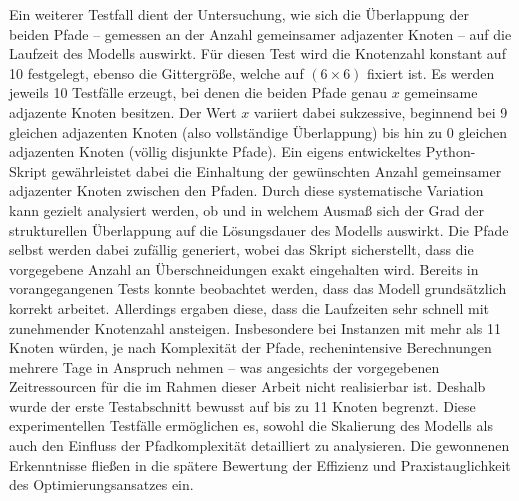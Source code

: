 \documentclass[bachelor, german]{algothesis}
\begin{document}
Ein weiterer Testfall dient der Untersuchung, wie sich die Überlappung der beiden Pfade – gemessen an der Anzahl gemeinsamer adjazenter Knoten – auf die Laufzeit des Modells auswirkt. Für diesen Test wird die Knotenzahl konstant auf 10 festgelegt, ebenso die Gittergröße, welche auf $(6 \times 6)$ fixiert ist. Es werden jeweils 10 Testfälle erzeugt, bei denen die beiden Pfade genau $x$ gemeinsame adjazente Knoten besitzen. Der Wert $x$ variiert dabei sukzessive, beginnend bei 9 gleichen adjazenten Knoten (also vollständige Überlappung) bis hin zu 0 gleichen adjazenten Knoten (völlig disjunkte Pfade). Ein eigens entwickeltes Python-Skript gewährleistet dabei die Einhaltung der gewünschten Anzahl gemeinsamer adjazenter Knoten zwischen den Pfaden. Durch diese systematische Variation kann gezielt analysiert werden, ob und in welchem Ausmaß sich der Grad der strukturellen Überlappung auf die Lösungsdauer des Modells auswirkt. Die Pfade selbst werden dabei zufällig generiert, wobei das Skript sicherstellt, dass die vorgegebene Anzahl an Überschneidungen exakt eingehalten wird.
\newline
Bereits in vorangegangenen Tests konnte beobachtet werden, dass das Modell grundsätzlich korrekt arbeitet. Allerdings ergaben diese, dass die Laufzeiten sehr schnell mit zunehmender Knotenzahl ansteigen. Insbesondere bei Instanzen mit mehr als 11 Knoten würden, je nach Komplexität der Pfade, rechenintensive Berechnungen mehrere Tage in Anspruch nehmen – was angesichts der vorgegebenen Zeitressourcen für die im Rahmen dieser Arbeit nicht realisierbar ist. Deshalb wurde der erste Testabschnitt bewusst auf bis zu 11 Knoten begrenzt.\newline
Diese experimentellen Testfälle ermöglichen es, sowohl die Skalierung des Modells als auch den Einfluss der Pfadkomplexität detailliert zu analysieren. Die gewonnenen Erkenntnisse fließen in die spätere Bewertung der Effizienz und Praxistauglichkeit des Optimierungsansatzes ein.
\end{document}
